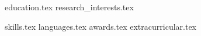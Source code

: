 \documentclass[a4,12pt]{article}
\begin{document}
\pagecolor{Black}
\color{white}


{education.tex}
{research_interests.tex}
\vspace{10}

\sidebyside
    {{skills.tex}}
    {{languages.tex}}
{awards.tex}
\pagebreak
{extracurricular.tex}
\end{document}
